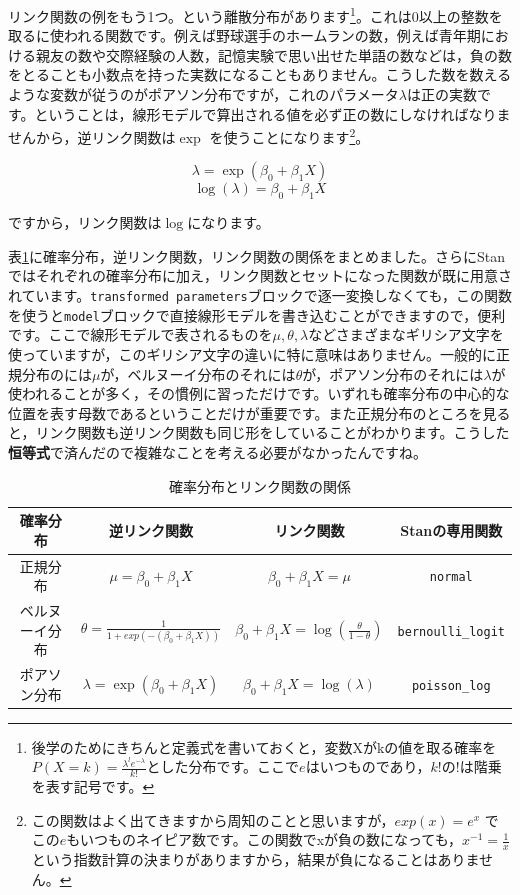 \documentclass{ltjsbook}
\begin{document}
リンク関数の例をもう1つ。という離散分布があります\footnote{後学のためにきちんと定義式を書いておくと，変数Xがkの値を取る確率を$P(X=k)=\frac{\lambda^l e^{-\lambda}}{k!}$とした分布です。ここで$e$はいつものであり，$k!$の$!$は階乗を表す記号です。}。これは0以上の整数を取るに使われる関数です。例えば野球選手のホームランの数，例えば青年期における親友の数や交際経験の人数，記憶実験で思い出せた単語の数などは，負の数をとることも小数点を持った実数になることもありません。こうした数を数えるような変数が従うのがポアソン分布ですが，これのパラメータ$\lambda$は正の実数です。ということは，線形モデルで算出される値を必ず正の数にしなければなりませんから，逆リンク関数は$\exp$ を使うことになります\footnote{この関数はよく出てきますから周知のことと思いますが，$exp(x)=e^x$ でこの$e$もいつものネイピア数です。この関数でxが負の数になっても，$x^{-1}=\frac{1}{x}$という指数計算の決まりがありますから，結果が負になることはありません。}。

\[ \lambda = \exp(\beta_0 + \beta_1 X) \]
\[ \log(\lambda) = \beta_0 + \beta_1X \]

ですから，リンク関数は$\log$になります。

表\ref{tbl::25_01}に確率分布，逆リンク関数，リンク関数の関係をまとめました。さらにStanではそれぞれの確率分布に加え，リンク関数とセットになった関数が既に用意されています。\verb|transformed parameters|ブロックで逐一変換しなくても，この関数を使うと\verb|model|ブロックで直接線形モデルを書き込むことができますので，便利です。ここで線形モデルで表されるものを$\mu,\theta,\lambda$などさまざまなギリシア文字を使っていますが，このギリシア文字の違いに特に意味はありません。一般的に正規分布のには$\mu$が，ベルヌーイ分布のそれには$\theta$が，ポアソン分布のそれには$\lambda$が使われることが多く，その慣例に習っただけです。いずれも確率分布の中心的な位置を表す母数であるということだけが重要です。また正規分布のところを見ると，リンク関数も逆リンク関数も同じ形をしていることがわかります。こうした\textbf{恒等式}で済んだので複雑なことを考える必要がなかったんですね。

\begin{table}[ht]
    \centering
    \caption{確率分布とリンク関数の関係}
    \begin{tabular}{cccc}
        確率分布 & 逆リンク関数 & リンク関数 & Stanの専用関数 \\\hline
        正規分布 & $\mu = \beta_0 + \beta_1 X$ & $\beta_0 + \beta_1X=\mu$ & \verb|normal| \\
        ベルヌーイ分布 & $\theta = \frac{1}{1+exp(-(\beta_0+\beta_1X))}$ & $\beta_0 + \beta_1 X = \log\left(\frac{\theta}{1-\theta}\right) $ & \verb|bernoulli_logit| \\
        ポアソン分布 & $\lambda = \exp(\beta_0 + \beta_1 X)$ & $\beta_0 + \beta_1X = \log(\lambda)$ & \verb|poisson_log| \\\hline
    \end{tabular}
    \label{tbl::25_01}
\end{table}
\end{document}

